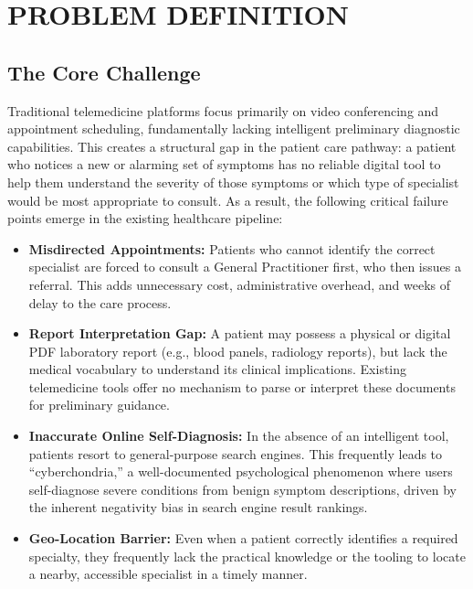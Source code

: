 \chapter{PROBLEM DEFINITION}

\section{The Core Challenge}

Traditional telemedicine platforms focus primarily on video conferencing and appointment scheduling, fundamentally lacking intelligent preliminary diagnostic capabilities. This creates a structural gap in the patient care pathway: a patient who notices a new or alarming set of symptoms has no reliable digital tool to help them understand the severity of those symptoms or which type of specialist would be most appropriate to consult. As a result, the following critical failure points emerge in the existing healthcare pipeline:

\begin{itemize}
    \item \textbf{Misdirected Appointments:} Patients who cannot identify the correct specialist are forced to consult a General Practitioner first, who then issues a referral. This adds unnecessary cost, administrative overhead, and weeks of delay to the care process.

    \item \textbf{Report Interpretation Gap:} A patient may possess a physical or digital PDF laboratory report (e.g., blood panels, radiology reports), but lack the medical vocabulary to understand its clinical implications. Existing telemedicine tools offer no mechanism to parse or interpret these documents for preliminary guidance.

    \item \textbf{Inaccurate Online Self-Diagnosis:} In the absence of an intelligent tool, patients resort to general-purpose search engines. This frequently leads to ``cyberchondria,'' a well-documented psychological phenomenon where users self-diagnose severe conditions from benign symptom descriptions, driven by the inherent negativity bias in search engine result rankings.

    \item \textbf{Geo-Location Barrier:} Even when a patient correctly identifies a required specialty, they frequently lack the practical knowledge or the tooling to locate a nearby, accessible specialist in a timely manner.
\end{itemize}

